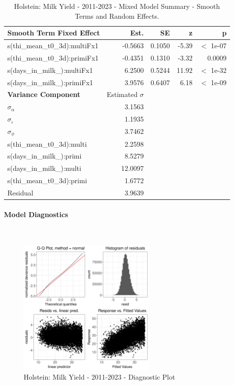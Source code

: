 \newpage
\begin{table}[H]
\centering
\begin{tabular}
{l | r | r | r | r}
\textbf{Smooth Term Fixed Effect} & Est. & SE & z & p\\
\hline
\hline
s(thi\_mean\_t0\_3d):multiFx1 & -0.5663 & 0.1050 & -5.39 & $<$ 1e-07\\
s(thi\_mean\_t0\_3d):primiFx1 & -0.4351 & 0.1310 & -3.32 & 0.0009\\
s(days\_in\_milk\_):multiFx1 & 6.2500 & 0.5244 & 11.92 & $<$ 1e-32\\
s(days\_in\_milk\_):primiFx1 &  3.9576 & 0.6407 & 6.18 & $<$ 1e-09\\
\hline
\textbf{Variance Component} & Estimated $\sigma$ & & & \\
\hline
\hline
$\sigma_\alpha$ & 3.1563 & &  & \\
$\sigma_\iota$ & 1.1935 & & & \\
$\sigma_\phi$ & 3.7462 & & & \\
s(thi\_mean\_t0\_3d):multi & 2.2598 & & & \\
s(days\_in\_milk\_):primi & 8.5279 & & & \\
s(days\_in\_milk\_):multi & 12.0097 & & & \\
s(thi\_mean\_t0\_3d):primi & 1.6772 & & & \\
Residual & 3.9639 & & & \\
\end{tabular}
\caption[]{Holstein: Milk Yield - 2011-2023 - Mixed Model Summary - Smooth Terms and Random Effects.}
\end{table}

\paragraph{Model Diagnostics} \quad \\
\begin{figure}[H]
    \centering
    \includegraphics[width=0.6\textwidth]{thesis/figures/models/milk/after2010/ho_milk_after2010/ho_milk_after2010_diagnostics.png}
    \caption[]{Holstein: Milk Yield - 2011-2023 - Diagnostic Plot}
\end{figure}

